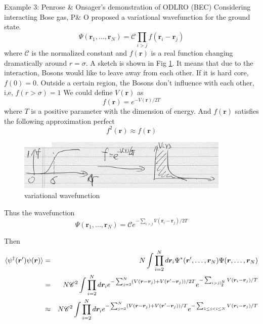 Example 3: Penrose \& Onsager's demonstration of ODLRO (BEC)
Considering interacting Bose gas, P\& O proposed a variational wavefunction for the ground state.
\begin{equation}
\Psi(\bm r_1,\ldots,\bm r_N) =\mathscr C \prod_{i>j} f(\bm r_i-\bm r_j)
\end{equation}
where $\mathscr C$ is the normalized constant and $f(\bm r)$ is a real function changing dramatically around $r = \sigma$. A sketch is shown in Fig \ref{fig:1-6}.
It means that due to the interaction, Bosons would like to leave away from each other. If it is hard core, $f(0) = 0$. Outside a certain region, the Bosons don't influence with each other, i,e, $f(r>\sigma) = 1$
We could define $V(\bm r)$ as 
\begin{equation}
f(\bm r) = e^{-V(\bm r)/2 T}
\end{equation}
where $T$ is a positive parameter with the dimension of energy. 
And $f(\bm r)$ satisfies the following approximation perfect
\begin{equation}
f^2(\bm r) \approx f(\bm r)
\end{equation}



\begin{figure}[htbp]
\centering
\includegraphics[width=4in]{image/ch1/1-6-var_func.pdf} 
\caption{variational wavefunction}
\label{fig:1-6}
\end{figure}

Thus the wavefunction
\begin{equation}
\Psi(\bm r_1,\ldots,\bm r_N) =\mathscr C e^{-\sum_{i>j}V(\bm r_i-\bm r_j)/2T}
\end{equation}

Then 
\begin{eqnarray}
\braket{\psi^\dag(\bm r')\psi(\bm r)} &=& N \int \prod_{i=2}^N d\bm r_i \Psi^*(\bm r',\ldots,\bm r_N)\Psi(\bm r,\ldots,\bm r_N)\notag\\
&=& N \mathscr C^2\int \prod_{i=2}^N d\bm r_i e^{-\sum_{j=2}^N (V(\bm r-\bm r_j)+V(\bm r'-\bm r_j))/2T} e^{-\sum_{i>j|_2^N} V(\bm r_i-\bm r_j)/T}\notag\\
&\approx& N \mathscr C^2\int \prod_{i=2}^N d\bm r_i e^{-\sum_{j=2}^N (V(\bm r-\bm r_j)+V(\bm r'-\bm r_j))/T} e^{-\sum_{1\leq j<i\leq N} V(\bm r_i-\bm r_j)/T}\notag\\
\end{eqnarray}

